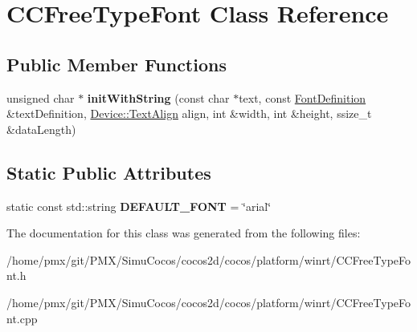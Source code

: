 \hypertarget{classCCFreeTypeFont}{}\section{C\+C\+Free\+Type\+Font Class Reference}
\label{classCCFreeTypeFont}
\subsection*{Public Member Functions}
\begin{DoxyCompactItemize}
\item 
\mbox{\label{classCCFreeTypeFont_adad088064814950e3ccc6cc7c4fb1c09}} 
unsigned char $\ast$ {\bfseries init\+With\+String} (const char $\ast$text, const \hyperlink{structFontDefinition}{Font\+Definition} \&text\+Definition, \hyperlink{classDevice_a62f8577d4803c8fce764f7cdff2abe92}{Device\+::\+Text\+Align} align, int \&width, int \&height, ssize\+\_\+t \&data\+Length)
\end{DoxyCompactItemize}
\subsection*{Static Public Attributes}
\begin{DoxyCompactItemize}
\item 
\mbox{\label{classCCFreeTypeFont_a0788f74eeb42f3fb8275a0fddef6032e}} 
static const std\+::string {\bfseries D\+E\+F\+A\+U\+L\+T\+\_\+\+F\+O\+NT} = \char`\"{}arial\char`\"{}
\end{DoxyCompactItemize}


The documentation for this class was generated from the following files\+:\begin{DoxyCompactItemize}
\item 
/home/pmx/git/\+P\+M\+X/\+Simu\+Cocos/cocos2d/cocos/platform/winrt/C\+C\+Free\+Type\+Font.\+h\item 
/home/pmx/git/\+P\+M\+X/\+Simu\+Cocos/cocos2d/cocos/platform/winrt/C\+C\+Free\+Type\+Font.\+cpp\end{DoxyCompactItemize}
